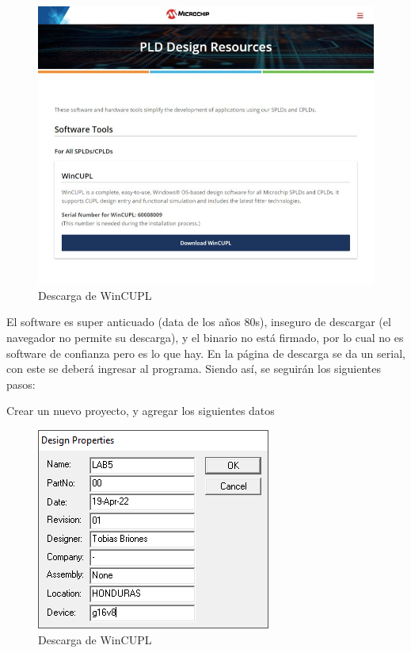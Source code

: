 \documentclass{article}
\begin{document}
    \begin{figure}[H]
        \centering
        \includegraphics[width=0.5\paperwidth]{images/microchip.com-download-wincupl}
        \caption{Descarga de WinCUPL}
    \end{figure}

    El software es super anticuado (data de los años 80s), inseguro de descargar (el navegador no permite su descarga), y el binario no está firmado, por lo cual no es software de confianza pero es lo que hay. En la página de descarga se da un serial, con este se deberá ingresar al programa. Siendo así, se seguirán los siguientes pasos:

    \bigbreak

    Crear un nuevo proyecto, y agregar los siguientes datos

    \begin{figure}[H]
        \centering
        \includegraphics[width=0.3\paperwidth]{images/wincupl-design-properties}
        \caption{Descarga de WinCUPL}
    \end{figure}
\end{document}
